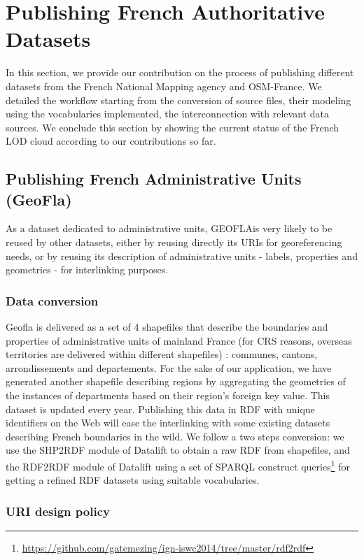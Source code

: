 \section{Publishing French Authoritative Datasets} \label{sec:publishing}   

In this section, we provide our contribution on the process of publishing different datasets from the French National Mapping agency and OSM-France. We detailed the workflow starting from the conversion of source files, their modeling using the vocabularies implemented, the interconnection with relevant data sources. We conclude this section by showing the current status of the French LOD cloud according to our contributions so far. 

\subsection{Publishing French Administrative Units (GeoFla)} \label{sec:geofla}
As a dataset dedicated to administrative units, GEOFLA\circledR is very likely to be reused by other datasets, either by reusing directly its URIs for georeferencing needs, or by reusing its description of administrative units - labels, properties and geometries - for interlinking purposes. 

\subsubsection{Data conversion}
\label{sec:dconversion}
Geofla  is delivered as a set of 4 shapefiles  that describe the boundaries and properties of administrative units of mainland France (for CRS reasons, overseas territories are delivered within different shapefiles) : communes, cantons, arrondissements and departements. For the sake of our application, we have generated another shapefile describing regions by aggregating the geometries of the instances of departments based on their region's foreign key value. This  dataset is updated every year.  Publishing this data in RDF with unique identifiers on the Web will ease the interlinking with some existing datasets describing French boundaries in the wild. We follow a two steps conversion: we use the SHP2RDF module of Datalift to obtain a raw RDF from shapefiles, and the RDF2RDF module of Datalift  using a set of SPARQL construct queries\footnote{ \url{https://github.com/gatemezing/ign-iswc2014/tree/master/rdf2rdf}} for getting a refined RDF datasets using suitable vocabularies.

\subsubsection{URI design policy} \label{sec:urigeofla}

